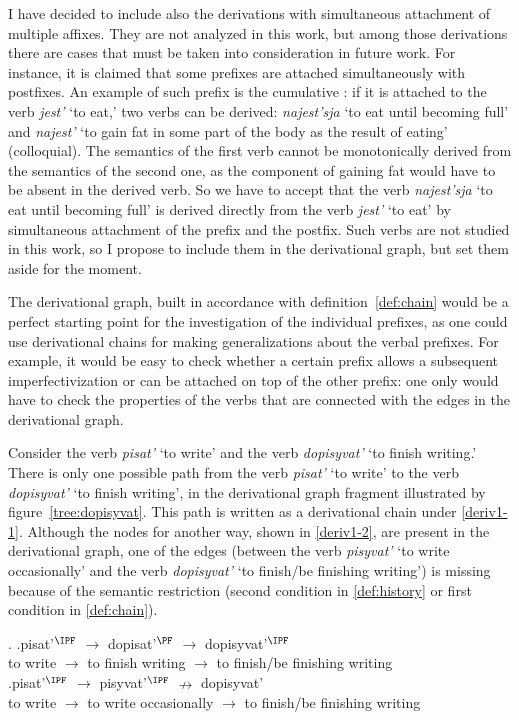 I have decided to include also the derivations with simultaneous attachment of multiple affixes. They are not analyzed in this work, but among those derivations there are cases that must be taken into consideration in future work. For instance, it is claimed that some prefixes are attached simultaneously with postfixes. An example of such prefix is the cumulative : if it is attached to the verb \textit{jest'} `to eat,' two verbs can be derived: \textit{najest'sja} `to eat until becoming full' and \textit{najest'} `to gain fat in some part of the body as the result of eating' (colloquial). The semantics of the first verb cannot be  monotonically derived from the semantics of the second one, as the component of gaining fat would have to be absent in the derived verb. So we have to accept that the verb \textit{najest'sja} `to eat until becoming full' is derived directly from the verb \textit{jest'} `to eat' by simultaneous attachment of the prefix and the postfix. Such verbs are not studied in this work, so I propose to include them in the derivational graph, but set them aside for the moment.
 
The derivational graph, built in accordance with definition~\ref{def:chain} would be a perfect starting point for the investigation of the individual prefixes, as one could use derivational chains for making generalizations about the verbal prefixes. For example, it would be easy to check whether a certain prefix allows a subsequent imperfectivization or can be attached on top of the other prefix: one only would have to check the properties of the verbs that are connected with the edges in the derivational graph. 

Consider the verb {\it pisat'} `to write' and the verb {\it dopisyvat'} `to finish writing.' There is only one possible path from the verb {\it pisat'} `to write' to the verb {\it dopisyvat'} `to finish writing', in the derivational graph fragment illustrated by figure~\ref{tree:dopisyvat}. This path is written as a derivational chain under \ref{deriv1-1}. Although the nodes for another way, shown in \ref{deriv1-2}, are present in the derivational graph, one of the edges (between the verb \textit{pisyvat'} `to write occasionally' and the verb \textit{dopisyvat'} `to finish/be finishing writing') is missing because of the semantic restriction (second condition in \ref{def:history} or first condition in \ref{def:chain}).

\ex.\label{deriv1} \ag.\label{deriv1-1}pisat'$^\IPF$ $\rightarrow$ dopisat'$^\PF$ $\rightarrow$ dopisyvat'$^\IPF$\\
{to write} $\rightarrow$ {to finish writing} $\rightarrow$ {to finish/be finishing writing}\\
\bg.\label{deriv1-2}pisat'$^\IPF$ $\rightarrow$ pisyvat'$^\IPF$ $\nrightarrow$ dopisyvat'\\
{to write} $\rightarrow$ {to write occasionally} $\rightarrow$ {to finish/be finishing writing}\\

